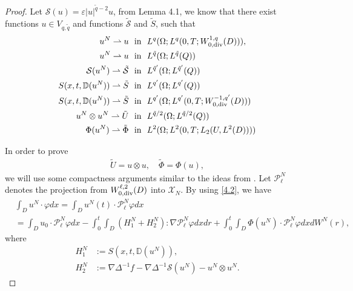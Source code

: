 \documentclass[reqno]{amsart}
\theoremstyle{definition}
\theoremstyle{remark}
\numberwithin{equation}{section} \allowdisplaybreaks
\begin{document}
\begin{proof}
Let $\mathcal{S}(u)=\varepsilon|u|^{\tilde{q}-2}u$, from Lemma 4.1,
we know that there exist functions $u\in V_{q,\tilde{q}}$ and
functions $\tilde{\mathcal{S}}$ and $\tilde{S}$, such that
\begin{align}\label{4.8}
u^N\rightharpoonup u &~\mbox{ in }~ L^q
(\Omega;L^q(0,T;W_{0,\rm{div}}^{1,q}(D))),\\
\label{4.9} u^N\rightharpoonup u& ~\mbox{ in }~
L^{\tilde{q}}(\Omega;L^{\tilde{q}}(Q)) \\
\label{4.10} \mathcal{S}(u^N)\rightharpoonup \tilde{\mathcal{S}}&
~\mbox{ in }~
L^{\tilde{q}'}(\Omega;L^{\tilde{q}'}(Q))\\
\label{4.11} S(x,t,\mathbb{D}(u^N))\rightharpoonup \tilde{S}&
~\mbox{ in }~
L^{q'}(\Omega; L^{q'}(Q)) \\
\label{4.12} S(x,t,\mathbb{D}(u^N))\rightharpoonup \tilde{S}&
~\mbox{ in }~ L^{q'} (\Omega;L^{q'}(0,T;W_{0,\rm{div}}^{-1,q'}(D)))
\\
\label{4.13} u^N\otimes u^N\rightharpoonup \tilde{U}& ~\mbox{ in }~
{L^{\tilde{q}/2}(\Omega;L^{\tilde{q}/2}(Q))} \\
\label{4.14} \Phi(u^N)\rightharpoonup \tilde{\Phi}& ~\mbox{ in }~
L^2 (\Omega;L^2(0,T;L_2({U},L^2(D))))
\end{align}

In order to prove
\begin{equation}\label{4.15}
\begin{split}
\tilde{U}=u\otimes u,\quad \tilde{\Phi}=\Phi(u),
\end{split}
\end{equation}
we will use some compactness arguments similar to the ideas from
\cite[Sec.4]{MH}. Let $\mathcal{P}^N_{\ell}$
denotes the projection from $W_{0,\rm{div}}^{\ell,2}(D)$
into $\mathcal{X}_N$. By using \eqref{4.2}, we have
\begin{align*}
&\int_{D}u^N\cdot\varphi dx=\int_{D}u^N(t)\cdot\mathcal{P}^N_{\ell}\varphi dx\\
&=\int_{D}u_0\cdot\mathcal{P}^N_{\ell}\varphi
dx-\int_0^t\!\!\!\int_{D}(H^N_1+H^N_2):\nabla\mathcal{P}^N_{\ell}\varphi
dxdr+\int_0^t\!\!\!\int_{D}\Phi(u^N)\cdot\mathcal{P}^N_{\ell}\varphi
dx dW^N(r),
\end{align*}
where
\begin{align*}
H_1^N&:=S(x,t,\mathbb{D}(u^N)),\\
H_2^N&:=\nabla\Delta^{-1}f-\nabla\Delta^{-1}\mathcal{S}(u^N)-u^N\otimes
u^N.
\end{align*}



\end{proof}
\end{document}
